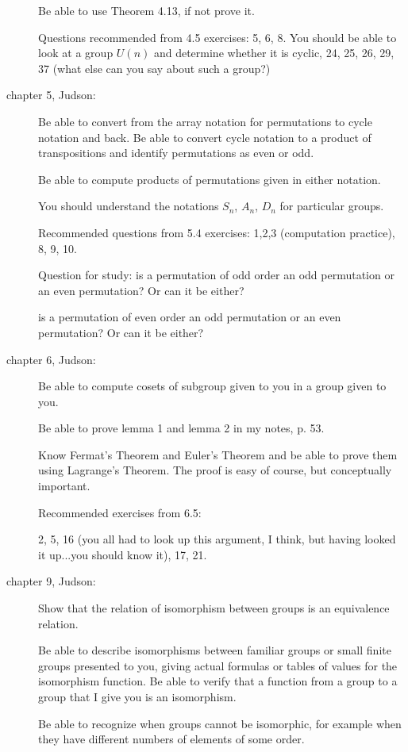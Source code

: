 \documentclass[12pt]{article}
\begin{document}
\begin{description}
Be able to use Theorem 4.13, if not prove it.

Questions recommended from 4.5 exercises:  5, 6, 8.  You should be able to look at a group $U(n)$ and determine whether it is cyclic, 24, 25, 26, 29, 37 (what else can you say about such a group?)

\item[chapter 5, Judson:]

Be able to convert from the array notation for permutations to cycle notation and back.  Be able to convert cycle notation to a product of transpositions and identify permutations as even or odd.

Be able to compute products of permutations given in either notation.

You should understand the notations $S_n$, $A_n$, $D_n$ for particular groups.

Recommended questions from 5.4 exercises:  1,2,3 (computation practice), 8, 9, 10.

Question for study:  is a permutation of odd order an odd permutation or an even permutation?  Or can it be either?

is a permutation of even order an odd permutation or an even permutation?  Or can it be either?

\item[chapter 6, Judson:]

Be able to compute cosets of  subgroup given to you in a group given to you.

Be able to prove lemma 1 and lemma 2 in my notes, p. 53.

Know Fermat's Theorem and Euler's Theorem and be able to prove them using Lagrange's Theorem.
The proof is easy of course, but conceptually important.

Recommended exercises from 6.5:

2, 5, 16 (you all had to look up this argument, I think, but having looked it up...you should know it), 17, 21.

\item[chapter 9, Judson:]

Show that the relation of isomorphism between groups is an equivalence relation.

Be able to describe isomorphisms between familiar groups or small finite groups presented to you, giving actual formulas or tables of values for the isomorphism function.  Be able to verify that a function from a group to a group that I give you
is an isomorphism.

Be able to recognize when groups cannot be isomorphic, for example when they have different numbers of elements of some order.


\end{description}
\end{document}
